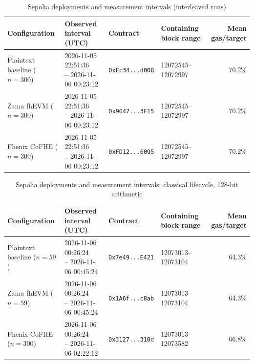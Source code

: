 \begin{table}[!t]
\caption{Sepolia deployments and measurement intervals (interleaved runs)}
\label{tab:sepolia-experiment-deployments}
\centering
\footnotesize
\setlength{\tabcolsep}{4pt}
\begin{tabular}{|l|l|l|l|r|}
\hline
\textbf{Configuration} &
\textbf{Observed interval (UTC)} &
\textbf{Contract} &
\textbf{Containing block range} &
\textbf{Mean gas/target} \\
\hline
Plaintext baseline (\(n=300\)) &
\shortstack[l]{2026-11-05 22:51:36 \\ -- 2026-11-06 00:23:12} &
\texttt{0xEc34...d008} &
12072545--12072997 &
70.2\% \\
\hline
Zama fhEVM (\(n=300\)) &
\shortstack[l]{2026-11-05 22:51:36 \\ -- 2026-11-06 00:23:12} &
\texttt{0x9047...3F15} &
12072545--12072997 &
70.2\% \\
\hline
Fhenix CoFHE (\(n=300\)) &
\shortstack[l]{2026-11-05 22:51:36 \\ -- 2026-11-06 00:23:12} &
\texttt{0xFD12...6095} &
12072545--12072997 &
70.2\% \\
\hline
\end{tabular}
\end{table}

\begin{table}[!t]
\caption{Sepolia deployments and measurement intervals: classical lifecycle, 128-bit arithmetic}
\label{tab:sepolia-experiment-deployments-classic-euint128}
\centering
\footnotesize
\setlength{\tabcolsep}{4pt}
\begin{tabular}{|l|l|l|l|r|}
\hline
\textbf{Configuration} &
\textbf{Observed interval (UTC)} &
\textbf{Contract} &
\textbf{Containing block range} &
\textbf{Mean gas/target} \\
\hline
Plaintext baseline (\(n=59\)) &
\shortstack[l]{2026-11-06 00:26:24 \\ -- 2026-11-06 00:45:24} &
\texttt{0x7e49...E421} &
12073013--12073104 &
64.3\% \\
\hline
Zama fhEVM (\(n=59\)) &
\shortstack[l]{2026-11-06 00:26:24 \\ -- 2026-11-06 00:45:24} &
\texttt{0x1A6f...c8ab} &
12073013--12073104 &
64.3\% \\
\hline
Fhenix CoFHE (\(n=300\)) &
\shortstack[l]{2026-11-06 00:26:24 \\ -- 2026-11-06 02:22:12} &
\texttt{0x3127...310d} &
12073013--12073582 &
66.8\% \\
\hline
\end{tabular}
\end{table}


